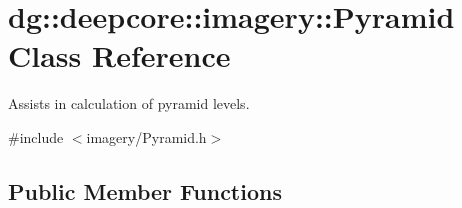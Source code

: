 \hypertarget{classdg_1_1deepcore_1_1imagery_1_1_pyramid}{}\section{dg\+:\+:deepcore\+:\+:imagery\+:\+:Pyramid Class Reference}
\label{classdg_1_1deepcore_1_1imagery_1_1_pyramid}


Assists in calculation of pyramid levels.  




{\ttfamily \#include $<$imagery/\+Pyramid.\+h$>$}

\subsection*{Public Member Functions}
